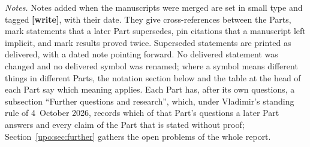 \documentclass[11pt,letterpaper]{article}
\theoremstyle{remark}\newtheorem{remark}[theorem]{Remark}
\numberwithin{equation}{section}
\begin{document}
\emph{Notes.} Notes added when the manuscripts were merged are set in small type and tagged \textbf{[write]}, with their date. They give cross-references between the Parts, mark statements that a later Part supersedes, pin citations that a manuscript left implicit, and mark results proved twice. Superseded statements are printed as delivered, with a dated note pointing forward. No delivered statement was changed and no delivered symbol was renamed; where a symbol means different things in different Parts, the notation section below and the table at the head of each Part say which meaning applies. Each Part has, after its own questions, a subsection ``Further questions and research'', which, under Vladimir's standing rule of 4~October 2026, records which of that Part's questions a later Part answers and every claim of the Part that is stated without proof; Section~\ref{upo:sec:further} gathers the open problems of the whole report.
\end{document}
